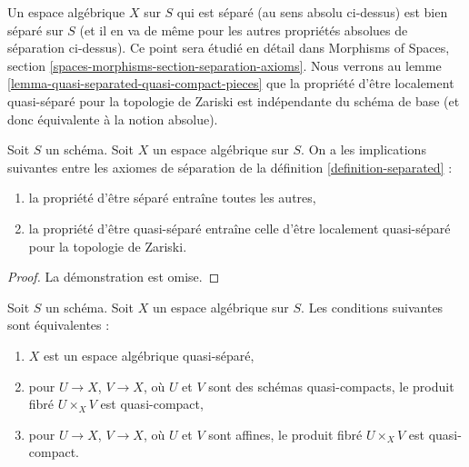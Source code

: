 \noindent
Un espace algébrique $X$ sur $S$ qui est séparé
(au sens absolu ci-dessus) est bien séparé sur $S$ (et il en va de même
pour les autres propriétés absolues de séparation ci-dessus). Ce point sera étudié
en détail dans
Morphisms of Spaces, section \ref{spaces-morphisms-section-separation-axioms}.
Nous verrons au
lemme \ref{lemma-quasi-separated-quasi-compact-pieces}
que la propriété d'être localement quasi-séparé pour la topologie de Zariski est indépendante du schéma de base
(et donc équivalente à la notion absolue).

\begin{lemma}
\label{lemma-trivial-implications}
Soit $S$ un schéma.
Soit $X$ un espace algébrique sur $S$.
On a les implications suivantes entre les axiomes de séparation
de la définition \ref{definition-separated} :
\begin{enumerate}
\item la propriété d'être séparé entraîne toutes les autres,
\item la propriété d'être quasi-séparé entraîne celle d'être localement quasi-séparé pour la topologie de Zariski.
\end{enumerate}
\end{lemma}

\begin{proof}
La démonstration est omise.
\end{proof}

\begin{lemma}
\label{lemma-characterize-quasi-separated}
Soit $S$ un schéma. Soit $X$ un espace algébrique sur $S$.
Les conditions suivantes sont équivalentes :
\begin{enumerate}
\item $X$ est un espace algébrique quasi-séparé,
\item pour $U \to X$, $V \to X$, où $U$ et $V$ sont des schémas quasi-compacts,
le produit fibré $U \times_X V$ est quasi-compact,
\item pour $U \to X$, $V \to X$, où $U$ et $V$ sont affines,
le produit fibré $U \times_X V$ est quasi-compact.
\end{enumerate}
\end{lemma}

